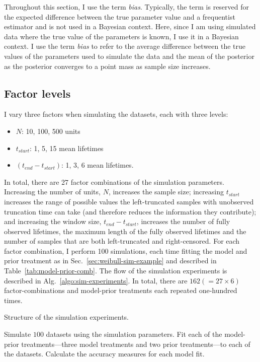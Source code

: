 Throughout this section, I use the term \textit{bias}. Typically, the term is reserved for the expected difference between the true parameter value and a frequentist estimator \citep[Sec.~6.3.1]{wasserman2004} and is not used in a Bayesian context. Here, since I am using simulated data where the true value of the parameters is known, I use it in a Bayesian context. I use the term \textit{bias} to refer to the average difference between the true values of the parameters used to simulate the data and the mean of the posterior as the posterior converges to a point mass as sample size increases.

\subsection{Factor levels} \label{subsec:factor-lvls}

I vary three factors when simulating the datasets, each with three levels:
\begin{itemize}
    \item[] $N$: 10, 100, 500 units
    \item[] $t_{start}$: 1, 5, 15 mean lifetimes
    \item[] $(t_{end} - t_{start})$: 1, 3, 6 mean lifetimes.
\end{itemize}
In total, there are 27 factor combinations of the simulation parameters. Increasing the number of units, $N$, increases the sample size; increasing $t_{start}$ increases the range of possible values the left-truncated samples with unobserved truncation time can take (and therefore reduces the information they contribute); and increasing the window size, $t_{end} - t_{start}$, increases the number of fully observed lifetimes, the maximum length of the fully observed lifetimes and the number of samples that are both left-truncated and right-censored. For each factor combination, I perform 100 simulations, each time fitting the model and prior treatment as in Sec.~\ref{sec:weibull-sim-example} and described in Table~\ref{tab:model-prior-comb}. The flow of the simulation experiments is described in Alg.~\ref{algo:sim-experiments}. In total, there are $162 (=27 \times 6)$ factor-combinations and model-prior treatments each repeated one-hundred times.

\begin{algorithm}
	\caption{Structure of the simulation experiments.}
  \label{algo:sim-experiments}
	\begin{algorithmic}[1]
    \State Simulate $100$ datasets using the simulation parameters.
    \State Fit each of the model-prior treatments---three model treatments and two prior treatments---to each of the datasets.
    \State Calculate the accuracy measures for each model fit.
    \EndFor
	\end{algorithmic} 
\end{algorithm} 

